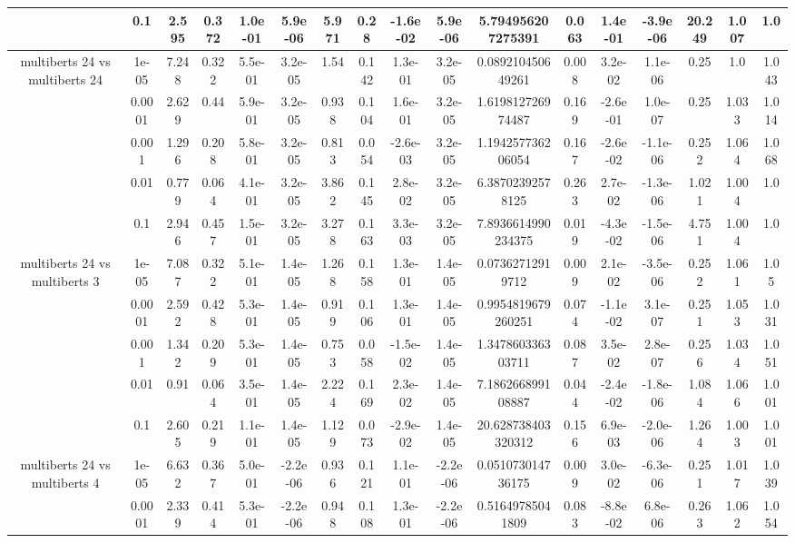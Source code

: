 \begin{tabular}{|c|c|c|c|c|c|c|c|c|c|c|c|c|c|c|c|c|}
 & 0.1 & 2.595 & 0.372 & 1.0e-01 & 5.9e-06 & 5.971 & 0.28 & -1.6e-02 & 5.9e-06 & 5.794956207275391 & 0.063 & 1.4e-01 & -3.9e-06 & 20.249 & 1.007 & 1.0 \\
\hline
\multirow{5}{*}{multiberts 24 vs multiberts 24} & 1e-05 & 7.248 & 0.322 & 5.5e-01 & 3.2e-05 & 1.54 & 0.142 & 1.3e-01 & 3.2e-05 & 0.089210450649261 & 0.008 & 3.2e-02 & 1.1e-06 & 0.25 & 1.0 & 1.043 \\
 & 0.0001 & 2.629 & 0.44 & 5.9e-01 & 3.2e-05 & 0.938 & 0.104 & 1.6e-01 & 3.2e-05 & 1.619812726974487 & 0.169 & -2.6e-01 & 1.0e-07 & 0.25 & 1.033 & 1.014 \\
 & 0.001 & 1.296 & 0.208 & 5.8e-01 & 3.2e-05 & 0.813 & 0.054 & -2.6e-03 & 3.2e-05 & 1.194257736206054 & 0.167 & -2.6e-02 & -1.1e-06 & 0.252 & 1.064 & 1.068 \\
 & 0.01 & 0.779 & 0.064 & 4.1e-01 & 3.2e-05 & 3.862 & 0.145 & 2.8e-02 & 3.2e-05 & 6.38702392578125 & 0.263 & 2.7e-02 & -1.3e-06 & 1.021 & 1.004 & 1.0 \\
 & 0.1 & 2.946 & 0.457 & 1.5e-01 & 3.2e-05 & 3.278 & 0.163 & 3.3e-03 & 3.2e-05 & 7.8936614990234375 & 0.019 & -4.3e-02 & -1.5e-06 & 4.751 & 1.004 & 1.0 \\
\hline
\multirow{5}{*}{multiberts 24 vs multiberts 3} & 1e-05 & 7.087 & 0.322 & 5.1e-01 & 1.4e-05 & 1.268 & 0.158 & 1.3e-01 & 1.4e-05 & 0.07362712919712 & 0.009 & 2.1e-02 & -3.5e-06 & 0.252 & 1.061 & 1.05 \\
 & 0.0001 & 2.592 & 0.428 & 5.3e-01 & 1.4e-05 & 0.919 & 0.106 & 1.3e-01 & 1.4e-05 & 0.9954819679260251 & 0.074 & -1.1e-02 & 3.1e-07 & 0.251 & 1.053 & 1.031 \\
 & 0.001 & 1.342 & 0.209 & 5.3e-01 & 1.4e-05 & 0.753 & 0.058 & -1.5e-02 & 1.4e-05 & 1.347860336303711 & 0.087 & 3.5e-02 & 2.8e-07 & 0.256 & 1.034 & 1.051 \\
 & 0.01 & 0.91 & 0.064 & 3.5e-01 & 1.4e-05 & 2.224 & 0.169 & 2.3e-02 & 1.4e-05 & 7.186266899108887 & 0.044 & -2.4e-02 & -1.8e-06 & 1.084 & 1.066 & 1.001 \\
 & 0.1 & 2.605 & 0.219 & 1.1e-01 & 1.4e-05 & 1.129 & 0.073 & -2.9e-02 & 1.4e-05 & 20.628738403320312 & 0.156 & 6.9e-03 & -2.0e-06 & 1.264 & 1.003 & 1.001 \\
\hline
\multirow{5}{*}{multiberts 24 vs multiberts 4} & 1e-05 & 6.632 & 0.367 & 5.0e-01 & -2.2e-06 & 0.936 & 0.121 & 1.1e-01 & -2.2e-06 & 0.051073014736175 & 0.009 & 3.0e-02 & -6.3e-06 & 0.251 & 1.017 & 1.039 \\
 & 0.0001 & 2.339 & 0.414 & 5.3e-01 & -2.2e-06 & 0.948 & 0.108 & 1.3e-01 & -2.2e-06 & 0.51649785041809 & 0.083 & -8.8e-02 & 6.8e-06 & 0.263 & 1.062 & 1.054 \\

\end{tabular}
